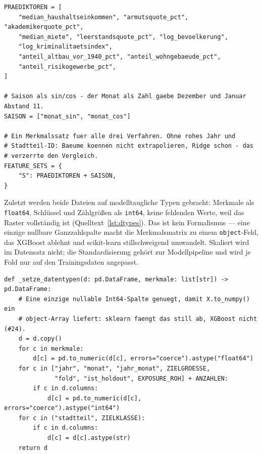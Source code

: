 \begin{lstlisting}[style=pythonstil,
  label={lst:merkmalsliste},
  caption={Merkmalssatz, einmalig hinterlegt
           (\texttt{prep/config.py}, Z.~106--131, gekürzt)}]
PRAEDIKTOREN = [
    "median_haushaltseinkommen", "armutsquote_pct", "akademikerquote_pct",
    "median_miete", "leerstandsquote_pct", "log_bevoelkerung",
    "log_kriminalitaetsindex",
    "anteil_altbau_vor_1940_pct", "anteil_wohngebaeude_pct",
    "anteil_risikogewerbe_pct",
]

# Saison als sin/cos - der Monat als Zahl gaebe Dezember und Januar Abstand 11.
SAISON = ["monat_sin", "monat_cos"]

# Ein Merkmalssatz fuer alle drei Verfahren. Ohne rohes Jahr und
# Stadtteil-ID: Baeume koennen nicht extrapolieren, Ridge schon - das
# verzerrte den Vergleich.
FEATURE_SETS = {
    "S": PRAEDIKTOREN + SAISON,
}
\end{lstlisting}

Zuletzt werden beide Dateien auf modelltaugliche Typen gebracht: Merkmale als
\texttt{float64}, Schlüssel und Zählgrößen als \texttt{int64}, keine fehlenden
Werte, weil das Raster vollständig ist (Quelltext~\ref{lst:dtypes}). Das ist
kein Formalismus --- eine einzige nullbare Ganzzahlspalte macht die
Merkmalsmatrix zu einem \texttt{object}-Feld, das XGBoost ablehnt und
scikit-learn stillschweigend umwandelt. Skaliert wird im Datensatz nicht; die
Standardisierung gehört zur Modellpipeline und wird je Fold nur auf den
Trainingsdaten angepasst.

\begin{lstlisting}[style=pythonstil,
  label={lst:dtypes},
  caption={Vereinheitlichung der Datentypen
           (\texttt{prep/s2\_datensaetze.py}, Z.~151--174, gekürzt)}]
def _setze_datentypen(d: pd.DataFrame, merkmale: list[str]) -> pd.DataFrame:
    # Eine einzige nullable Int64-Spalte genuegt, damit X.to_numpy() ein
    # object-Array liefert: sklearn faengt das still ab, XGBoost nicht (#24).
    d = d.copy()
    for c in merkmale:
        d[c] = pd.to_numeric(d[c], errors="coerce").astype("float64")
    for c in ["jahr", "monat", "jahr_monat", ZIELGROESSE,
              "fold", "ist_holdout", EXPOSURE_ROH] + ANZAHLEN:
        if c in d.columns:
            d[c] = pd.to_numeric(d[c], errors="coerce").astype("int64")
    for c in ("stadtteil", ZIELKLASSE):
        if c in d.columns:
            d[c] = d[c].astype(str)
    return d
\end{lstlisting}


